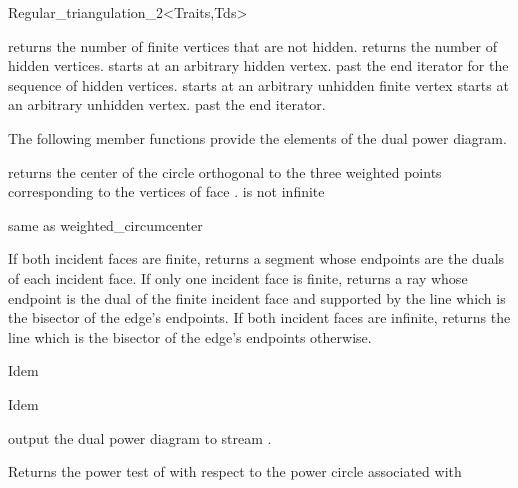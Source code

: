\begin{ccRefClass}{Regular_triangulation_2<Traits,Tds>}

{returns the number of finite vertices that are not hidden.}
\ccGlue
{}
{returns the number of hidden vertices.}
\ccGlue
{}
{starts at an arbitrary hidden vertex.}
\ccGlue
{}
{past the end iterator for the sequence of hidden vertices.}
\ccGlue
{}
{starts at an arbitrary unhidden finite vertex}
\ccGlue
{}
\ccGlue
{}
{starts at an arbitrary unhidden vertex.}
\ccGlue
{}
{past the end iterator.}

The following member functions provide the elements of the
dual power diagram.

{returns the center of the circle orthogonal to the three weighted
points corresponding to the vertices of face .
\ccPrecond {} is not infinite}

{same as weighted\_circumcenter}

{If both incident faces are finite, returns a segment whose endpoints are the
duals of each incident face. If only one incident face is finite, returns a
ray whose endpoint is the dual of the finite incident face and supported by
the line which is the bisector of the edge's endpoints. If both incident faces
are infinite, returns the line which is the bisector of the edge's endpoints
otherwise.  }

{Idem}

{Idem}

{output the dual power diagram to stream .}

\ccPredicates
{}
\ccThreeToTwo

{Returns the power test of   with respect to the 
power circle  associated with }




\end{ccRefClass}
